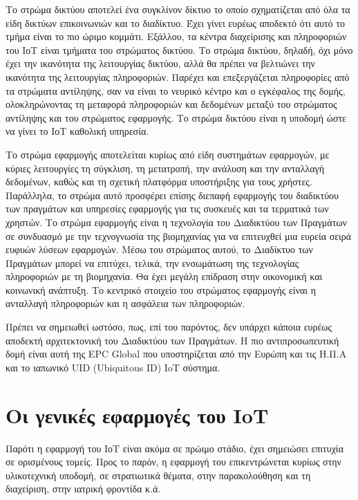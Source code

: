 \documentclass[12pt, a4paper, oneside]{report}
\begin{document}
Το στρώμα δικτύου αποτελεί ένα συγκλίνον δίκτυο το οποίο σχηματίζεται από όλα τα είδη δικτύων επικοινωνιών και το διαδίκτυο. Έχει γίνει ευρέως αποδεκτό ότι αυτό το τμήμα είναι το πιο ώριμο κομμάτι. Εξάλλου, τα κέντρα διαχείρισης και πληροφοριών του ΙοΤ είναι τμήματα του στρώματος δικτύου. Το στρώμα δικτύου, δηλαδή, όχι μόνο έχει την ικανότητα της λειτουργίας δικτύου, αλλά θα πρέπει να βελτιώνει την ικανότητα της λειτουργίας πληροφοριών. Παρέχει και επεξεργάζεται πληροφορίες από τα στρώματα αντίληψης, σαν να είναι το νευρικό κέντρο και ο εγκέφαλος της δομής, ολοκληρώνοντας τη μεταφορά πληροφοριών και δεδομένων μεταξύ του στρώματος αντίληψης και του στρώματος εφαρμογής. Το στρώμα δικτύου είναι η υποδομή ώστε να γίνει το ΙοΤ καθολική υπηρεσία.

Το στρώμα εφαρμογής αποτελείται κυρίως από είδη συστημάτων εφαρμογών, με κύριες λειτουργίες τη σύγκλιση, τη μετατροπή, την ανάλυση και την ανταλλαγή δεδομένων, καθώς και τη σχετική πλατφόρμα υποστήριξης για τους χρήστες. Παράλληλα, το στρώμα αυτό προσφέρει επίσης διεπαφή εφαρμογής του διαδικτύου των πραγμάτων και υπηρεσίες εφαρμογής για τις συσκευές και τα τερματικά των χρηστών. Το στρώμα εφαρμογής είναι η τεχνολογία του Διαδικτύου των Πραγμάτων σε συνδυασμό με την τεχνογνωσία της βιομηχανίας για να επιτευχθεί μια ευρεία σειρά ευφυών λύσεων εφαρμογών. Μέσω του στρώματος αυτού, το Διαδίκτυο των Πραγμάτων μπορεί να επιτύχει, τελικά, την ενσωμάτωση της τεχνολογίας πληροφοριών με τη βιομηχανία. Θα έχει μεγάλη επίδραση στην οικονομική και κοινωνική ανάπτυξη. Το κεντρικό στοιχείο του στρώματος εφαρμογής είναι η ανταλλαγή πληροφοριών και η ασφάλεια των πληροφοριών.

Πρέπει να σημειωθεί ωστόσο, πως, επί του παρόντος, δεν υπάρχει κάποια ευρέως αποδεκτή αρχιτεκτονική του Διαδικτύου των Πραγμάτων. Η πιο αντιπροσωπευτική δομή είναι αυτή της EPC Global που υποστηρίζεται από την Ευρώπη και τις Η.Π.Α και το ιαπωνικό UID (Ubiquitous ID) IoT σύστημα.

\section{Οι γενικές εφαρμογές του IoT}

Παρότι η εφαρμογή του ΙοΤ είναι ακόμα σε πρώιμο στάδιο, έχει σημειώσει επιτυχία σε ορισμένους τομείς. Προς το παρόν, η εφαρμογή του επικεντρώνεται κυρίως στην υλικοτεχνική υποδομή, σε στρατιωτικά θέματα, στην παρακολούθηση και τη διαχείριση, στην ιατρική φροντίδα κ.ά.
\end{document}
